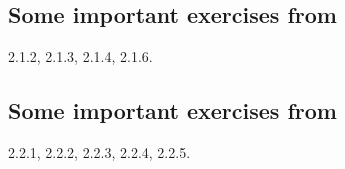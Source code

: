 \subsection{Some important exercises from~\cite[\S2.1.6]{VianaOliveiraFoundErgTh}}
\label{sec:some-import-exerc-2.1.6}

2.1.2, 2.1.3, 2.1.4, 2.1.6.

\subsection{Some important exercises from~\cite[\S2.2.1]{VianaOliveiraFoundErgTh}}
\label{sec:some-import-exerc-2.2.1}

2.2.1, 2.2.2, 2.2.3, 2.2.4, 2.2.5.
